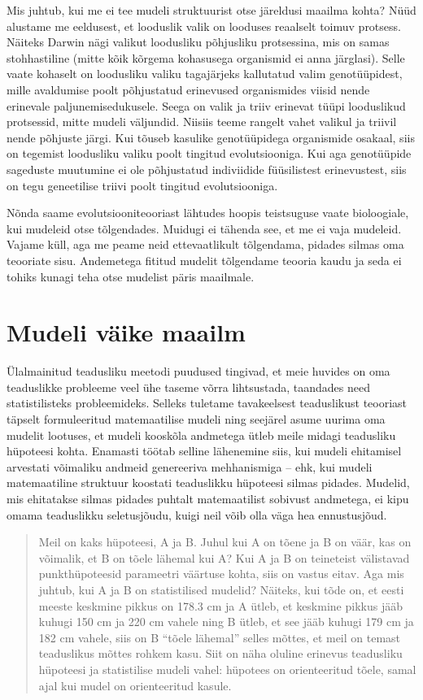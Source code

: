 \documentclass[]{book}
\begin{document}
Mis juhtub, kui me ei tee mudeli struktuurist otse järeldusi maailma
kohta? Nüüd alustame me eeldusest, et looduslik valik on looduses
reaalselt toimuv protsess. Näiteks Darwin nägi valikut loodusliku
põhjusliku protsessina, mis on samas stohhastiline (mitte kõik kõrgema
kohasusega organismid ei anna järglasi). Selle vaate kohaselt on
loodusliku valiku tagajärjeks kallutatud valim genotüüpidest, mille
avaldumise poolt põhjustatud erinevused organismides viisid nende
erinevale paljunemisedukusele. Seega on valik ja triiv erinevat tüüpi
looduslikud protsessid, mitte mudeli väljundid. Niisiis teeme rangelt
vahet valikul ja triivil nende põhjuste järgi. Kui tõuseb kasulike
genotüüpidega organismide osakaal, siis on tegemist loodusliku valiku
poolt tingitud evolutsiooniga. Kui aga genotüüpide sageduste muutumine
ei ole põhjustatud indiviidide füüsilistest erinevustest, siis on tegu
geneetilise triivi poolt tingitud evolutsiooniga.

Nõnda saame evolutsiooniteooriast lähtudes hoopis teistsuguse vaate
bioloogiale, kui mudeleid otse tõlgendades. Muidugi ei tähenda see, et
me ei vaja mudeleid. Vajame küll, aga me peame neid ettevaatlikult
tõlgendama, pidades silmas oma teooriate sisu. Andemetega fititud
mudelit tõlgendame teooria kaudu ja seda ei tohiks kunagi teha otse
mudelist päris maailmale.

\section*{Mudeli väike maailm}\label{mudeli-vaike-maailm}

Ülalmainitud teadusliku meetodi puudused tingivad, et meie huvides on
oma teaduslikke probleeme veel ühe taseme võrra lihtsustada, taandades
need statistilisteks probleemideks. Selleks tuletame tavakeelsest
teaduslikust teooriast täpselt formuleeritud matemaatilise mudeli ning
seejärel asume uurima oma mudelit lootuses, et mudeli kooskõla andmetega
ütleb meile midagi teadusliku hüpoteesi kohta. Enamasti töötab selline
lähenemine siis, kui mudeli ehitamisel arvestati võimaliku andmeid
genereeriva mehhanismiga -- ehk, kui mudeli matemaatiline struktuur
koostati teaduslikku hüpoteesi silmas pidades. Mudelid, mis ehitatakse
silmas pidades puhtalt matemaatilist sobivust andmetega, ei kipu omama
teaduslikku seletusjõudu, kuigi neil võib olla väga hea ennustusjõud.

\begin{quote}
Meil on kaks hüpoteesi, A ja B. Juhul kui A on tõene ja B on väär, kas
on võimalik, et B on tõele lähemal kui A? Kui A ja B on teineteist
välistavad punkthüpoteesid parameetri väärtuse kohta, siis on vastus
eitav. Aga mis juhtub, kui A ja B on statistilised mudelid? Näiteks, kui
tõde on, et eesti meeste keskmine pikkus on 178.3 cm ja A ütleb, et
keskmine pikkus jääb kuhugi 150 cm ja 220 cm vahele ning B ütleb, et see
jääb kuhugi 179 cm ja 182 cm vahele, siis on B ``tõele lähemal'' selles
mõttes, et meil on temast teaduslikus mõttes rohkem kasu. Siit on näha
oluline erinevus teadusliku hüpoteesi ja statistilise mudeli vahel:
hüpotees on orienteeritud tõele, samal ajal kui mudel on orienteeritud
kasule.
\end{quote}
\end{document}
